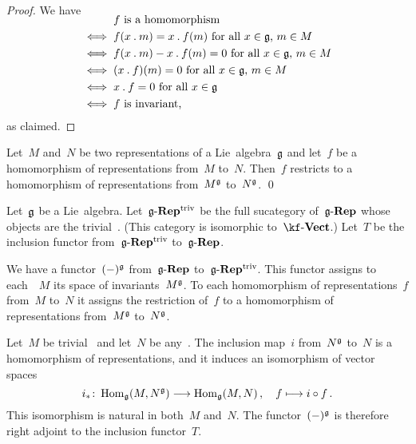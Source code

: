 \begin{proof}
	We have
	\begin{align*}
		\SwapAboveDisplaySkip
				{}& \text{$f$ is a homomorphism}  \\
		\iff{}& \text{$f(x \act m) = x \act f(m)$ for all~$x \in \glie$,~$m \in M$}  \\
		\iff{}& \text{$f(x \act m) - x \act f(m) = 0$ for all~$x \in \glie$,~$m \in M$}  \\
		\iff{}& \text{$(x \act f)(m) = 0$ for all~$x \in \glie$,~$m \in M$} \\
		\iff{}& \text{$x \act f = 0$ for all~$x \in \glie$}  \\
		\iff{}& \text{$f$ is invariant,}
	\end{align*}
	as claimed.
\end{proof}


\begin{proposition}
	Let~$M$ and~$N$ be two representations of a Lie~algebra~$\glie$ and let~$f$ be a homomorphism of representations from~$M$ to~$N$.
	Then~$f$ restricts to a homomorphism of representations from~$M^{\mathfrak{g}}$ to~$N^{\mathfrak{g}}$.
	\qed
\end{proposition}


\begin{remark}
	\label{invariants are right adjoint}
	Let~$\glie$ be a Lie~algebra.
	Let~$\smash{\mathfrak{g}\text{-}\mathbf{Rep}}^{\mathrm{triv}}$ be the full sucategory of~$\mathfrak{g}\text{-}\mathbf{Rep}$ whose objects are the trivial~\representations{$\glie$}.
	(This category is isomorphic to~$\cVect{\kf}$.)
	Let~$T$ be the inclusion functor from~$\smash{\mathfrak{g}\text{-}\mathbf{Rep}}^{\mathrm{triv}}$ to~$\mathfrak{g}\text{-}\mathbf{Rep}$.

	We have a functor~$(-)^{\mathfrak{g}}$ from~$\mathfrak{g}\text{-}\mathbf{Rep}$ to~$\smash{\mathfrak{g}\text{-}\mathbf{Rep}}^{\mathrm{triv}}$.
	This functor assigns to each~\representation{$\glie$}~$M$ its space of invariants~$M^{\mathfrak{g}}$.
	To each homomorphism of representations~$f$ from~$M$ to~$N$ it assigns the restriction of~$f$ to a homomorphism of representations from~$M^{\mathfrak{g}}$ to~$N^{\mathfrak{g}}$.

	Let~$M$ be trivial~\representation{$\glie$} and let~$N$ be any~\representation{$\glie$}.
	The inclusion map~$i$ from~$N^{\mathfrak{g}}$ to~$N$ is a homomorphism of representations, and it induces an isomorphism of vector spaces
	\[
		i_*
		\colon
		\Hom_{\glie}(M, N^{\glie})
		\to
		\Hom_{\glie}(M, N) \,,
		\quad
		f
		\mapsto
		i \circ f \,.
	\]
	This isomorphism is natural in both~$M$ and~$N$.
	The functor~$(-)^{\mathfrak{g}}$ is therefore right adjoint to the inclusion functor~$T$.
\end{remark}


